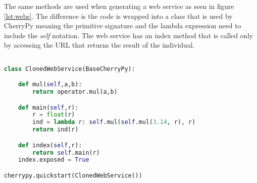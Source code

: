 The same methods are used when generating a web service as seen in figure \ref{lst:webs}. The difference is the code is wrapped into a class that is used
by CherryPy meaning the primitive signature and the lambda expression need to include the \textit{self} notation. The web service has
an index method that is called only by accessing the URL that returns the result of the individual.

\begin{lstlisting}[language=Python,caption={A generated web service that is the result of the Darwin framework},label={lst:webs}]

class ClonedWebService(BaseCherryPy):

    def mul(self,a,b):
        return operator.mul(a,b)

    def main(self,r):
        r = float(r)
        ind = lambda r: self.mul(self.mul(3.14, r), r)
        return ind(r)

    def index(self,r):
        return self.main(r)
    index.exposed = True

cherrypy.quickstart(ClonedWebService())
\end{lstlisting}